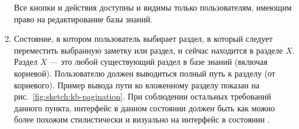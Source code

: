 \begin{enumerate}
            Все кнопки и действия доступны и видимы только пользователям, имеющим право на редактирование
            базы знаний.

        \item \label{itm:req:ui:states:move-kbo}

            Состояние, в котором пользователь выбирает раздел, в который следует переместить
            выбранную заметку или раздел, и сейчас находится в разделе \(X\).
            Раздел \(X\) --- это любой существующий раздел в базе знаний (включая корневой).
            Пользователю должен выводиться полный путь к разделу (от корневого). Пример
            вывода пути ко вложенному разделу показан на рис.~\ref{fig:sketch:kb-pagination}.
            При соблюдении остальных требований данного пункта, интерфейс в данном состоянии
            должен быть как можно более похожим стилистически и визуально на интерфейс
            в состоянии
            \hyperref[itm:req:ui:states:navx]
            {}.


\end{enumerate}
